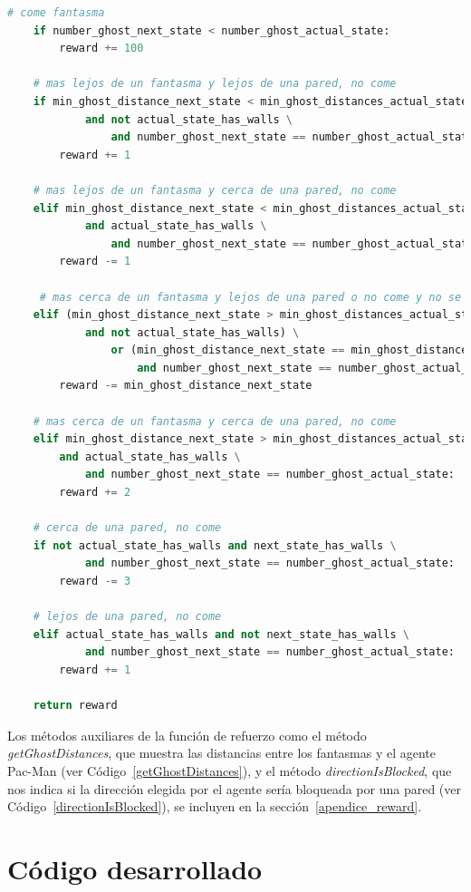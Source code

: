 \documentclass[11pt]{exam}
\begin{document}
\begin{lstlisting}[caption={Función de refuerzo.}, label={reward}, language=python, basicstyle=\scriptsize]
	# come fantasma
	if number_ghost_next_state < number_ghost_actual_state:
		reward += 100
	
	# mas lejos de un fantasma y lejos de una pared, no come
	if min_ghost_distance_next_state < min_ghost_distances_actual_state \
			and not actual_state_has_walls \
				and number_ghost_next_state == number_ghost_actual_state:
		reward += 1
	
	# mas lejos de un fantasma y cerca de una pared, no come
	elif min_ghost_distance_next_state < min_ghost_distances_actual_state \
			and actual_state_has_walls \
				and number_ghost_next_state == number_ghost_actual_state:
		reward -= 1
	
	 # mas cerca de un fantasma y lejos de una pared o no come y no se mueve
	elif (min_ghost_distance_next_state > min_ghost_distances_actual_state 
			and not actual_state_has_walls) \
				or (min_ghost_distance_next_state == min_ghost_distances_actual_state
					and number_ghost_next_state == number_ghost_actual_state):
		reward -= min_ghost_distance_next_state
	
	# mas cerca de un fantasma y cerca de una pared, no come
	elif min_ghost_distance_next_state > min_ghost_distances_actual_state \
		and actual_state_has_walls \
			and number_ghost_next_state == number_ghost_actual_state:
		reward += 2
	
	# cerca de una pared, no come
	if not actual_state_has_walls and next_state_has_walls \
			and number_ghost_next_state == number_ghost_actual_state:
		reward -= 3
		
	# lejos de una pared, no come
	elif actual_state_has_walls and not next_state_has_walls \
			and number_ghost_next_state == number_ghost_actual_state:
		reward += 1
	
	return reward
\end{lstlisting}

Los métodos auxiliares de la función de refuerzo como el método \textit{getGhostDistances}, que muestra las distancias entre los fantasmas y el agente Pac-Man (ver Código~\ref{getGhostDistances}), y el método \textit{directionIsBlocked}, que nos indica si la dirección elegida por el agente sería bloqueada por una pared (ver Código~\ref{directionIsBlocked}), se incluyen en la sección~\ref{apendice_reward}.

\section{Código desarrollado}\label{codigo}
\end{document}
